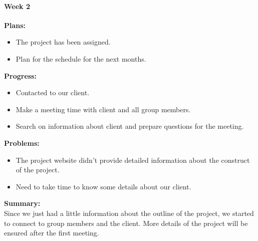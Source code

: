 \paragraph{Week 2}
\begin{adjustwidth}{2.5em}{0pt}
    \vspace{-0.5cm}\textbf{Plans:}
    \vspace{-0.5cm}
    \begin{itemize}
        \item The project has been assigned.
        \item Plan for the schedule for the next months. 
    \end{itemize} 
    \vspace{-0.3cm}\textbf{Progress:}
    \vspace{-0.5cm}
    \begin{itemize}
        \item Contacted to our client.
        \item Make a meeting time with client and all group members.
        \item Search on information about client and prepare questions for the meeting.
    \end{itemize} 
    \vspace{-0.3cm}\textbf{Problems:}
    \vspace{-0.5cm}
    \begin{itemize}
        \item The project website didn't provide detailed information about the construct of the project. 
        \item Need to take time to know some details about our client.
    \end{itemize}  
    \vspace{-0.3cm}\noindent\textbf{Summary:}\\
    \noindent Since we just had a little information about the outline of the project, we started to 
    connect to group members and the client. More details of the project will be ensured after the first 
    meeting. \\
\end{adjustwidth} 

